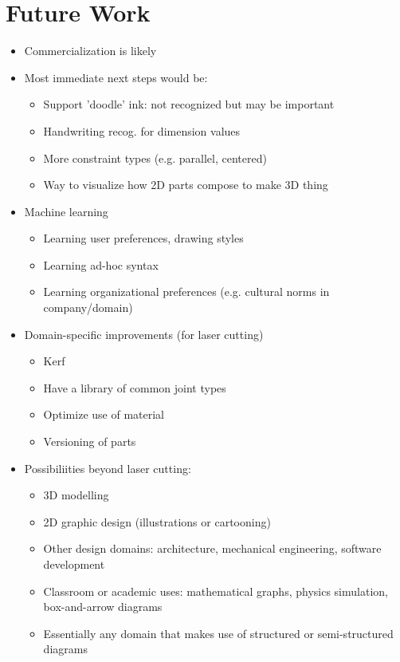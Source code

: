 \section{Future Work}

\begin{itemize}
\item Commercialization is likely
\item Most immediate next steps would be:
  \begin{itemize}
  \item Support 'doodle' ink: not recognized but may be important
  \item Handwriting recog. for dimension values
  \item More constraint types (e.g. parallel, centered)
  \item Way to visualize how 2D parts compose to make 3D thing
  \end{itemize}
\item Machine learning
  \begin{itemize}
    \item Learning user preferences, drawing styles
    \item Learning ad-hoc syntax
    \item Learning organizational preferences (e.g. cultural norms in
      company/domain)
  \end{itemize}
\item Domain-specific improvements (for laser cutting)
  \begin{itemize}
  \item Kerf
  \item Have a library of common joint types
  \item Optimize use of material
  \item Versioning of parts
  \end{itemize}
\item Possibiliities beyond laser cutting:
  \begin{itemize}
  \item 3D modelling
  \item 2D graphic design (illustrations or cartooning)
  \item Other design domains: architecture, mechanical engineering,
    software development
  \item Classroom or academic uses: mathematical graphs, physics
    simulation, box-and-arrow diagrams
  \item Essentially any domain that makes use of structured or
    semi-structured diagrams
  \end{itemize}
\end{itemize}
